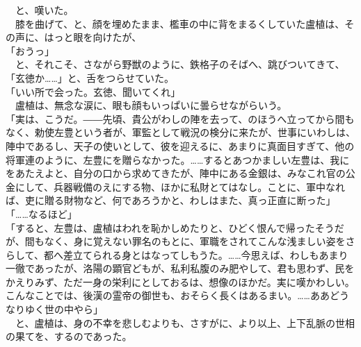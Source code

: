 \documentclass[
  paper=a5,
  fontsize=10pt,
  jafontsize=9.5pt,
  tate,                  %
  open_bracket_pos=nibu, %
]{jlreq}
\begin{document}
　と、嘆いた。\\


　膝を曲げて、と、顔を埋めたまま、檻車の中に背をまるくしていた盧植は、その声に、はっと眼を向けたが、\\


「おうっ」\\


　と、それこそ、さながら野獣のように、鉄格子のそばへ、跳びついてきて、\\


「玄徳か……」と、舌をつらせていた。\\


「いい所で会った。玄徳、聞いてくれ」\\


　盧植は、無念な涙に、眼も顔もいっぱいに曇らせながらいう。\\


「実は、こうだ。――先頃、貴公がわしの陣を去って、のほうへ立ってから間もなく、勅使左豊という者が、軍監として戦況の検分に来たが、世事にいわしは、陣中であるし、天子の使いとして、彼を迎えるに、あまりに真面目すぎて、他の将軍連のように、左豊にを贈らなかった。……するとあつかましい左豊は、我にをあたえよと、自分の口から求めてきたが、陣中にある金銀は、みなこれ官の公金にして、兵器戦備のえにする物、ほかに私財とてはなし。ことに、軍中なれば、吏に贈る財物など、何であろうかと、わしはまた、真っ正直に断った」\\


「……なるほど」\\


「すると、左豊は、盧植はわれを恥かしめたりと、ひどく恨んで帰ったそうだが、間もなく、身に覚えない罪名のもとに、軍職をされてこんな浅ましい姿をさらして、都へ差立てられる身とはなってしもうた。……今思えば、わしもあまり一徹であったが、洛陽の顕官どもが、私利私腹のみ肥やして、君も思わず、民をかえりみず、ただ一身の栄利にとしておるは、想像のほかだ。実に嘆かわしい。こんなことでは、後漢の霊帝の御世も、おそらく長くはあるまい。……ああどうなりゆく世の中やら」\\


　と、盧植は、身の不幸を悲しむよりも、さすがに、より以上、上下乱脈の世相の果てを、するのであった。\\

\\
\end{document}
